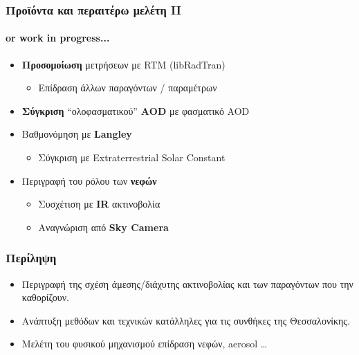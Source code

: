 \documentclass[hyperref={pdfpagelabels=false}]{beamer}
\begin{document}
\begin{frame}%
\frametitle{Προϊόντα και περαιτέρω μελέτη II}
\framesubtitle{or work in progress...}
    \begin{itemize}

         \item <1->\textbf{Προσομοίωση} μετρήσεων με RTM (libRadTran)
            \begin{itemize}
                \item Επίδραση άλλων παραγόντων / παραμέτρων 
            \end{itemize}
         \item <2->\textbf{Σύγκριση} ``ολοφασματικού'' \textbf{ΑΟD} με φασματικό AOD
         \item <3->Βαθμονόμηση με \textbf{Langley}
            \begin{itemize}
                \item Σύγκριση με Extraterrestrial Solar Constant
            \end{itemize}
         \item <4->Περιγραφή του ρόλου των \textbf{νεφών}
         \begin{itemize}
            \item Συσχέτιση με \textbf{IR} ακτινοβολία
            \item Αναγνώριση από \textbf{Sky Camera}
         \end{itemize}
    \end{itemize}

\end{frame}


\begin{frame}%
\frametitle{Περίληψη}


\begin{itemize}
    \item <1->Περιγραφή της σχέση άμεσης/διάχυτης ακτινοβολίας και των παραγόντων που την καθορίζουν.
    \item <2->Ανάπτυξη μεθόδων και τεχνικών κατάλληλες για τις συνθήκες της Θεσσαλονίκης.
    \item <3->Μελέτη του φυσικού μηχανισμού επίδραση νεφών, aerosol \ldots
\end{itemize}


\end{frame}
\end{document}
